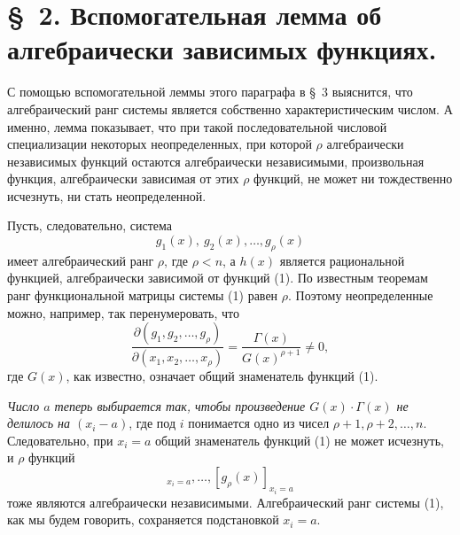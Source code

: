 \documentclass[11pt]{article}
\begin{document}
\section*{\S\ 2. Вспомогательная лемма об алгебраически зависимых функциях.}

С помощью вспомогательной леммы этого параграфа в \S\ 3 выяснится, что алгебраический ранг системы является собственно характеристическим числом. А именно, лемма показывает, что при такой последовательной числовой специализации некоторых неопределенных, при которой $\rho$ алгебраически независимых функций остаются алгебраически независимыми, произвольная функция, алгебраически зависимая от этих $\rho$ функций, не может ни тождественно исчезнуть, ни стать неопределенной.

Пусть, следовательно, система
\begin{equation}
  g_1(x),\ g_2(x),\ldots,g_\rho(x)
\tag{1}
\end{equation}
имеет алгебраический ранг $\rho$, где $\rho<n$, а $h(x)$ является рациональной функцией, алгебраически зависимой от функций (1). По известным теоремам ранг функциональной матрицы системы (1) равен $\rho$. Поэтому неопределенные можно, например, так перенумеровать, что
\begin{equation}
 \frac{\partial(g_1,g_2,\ldots,g_\rho)}{\partial(x_1,x_2,\ldots,x_\rho)}
 =\frac{\Gamma(x)}{G(x)^{\rho+1}}\ne0,
\tag{2}
\end{equation}
где $G(x)$, как известно, означает общий знаменатель функций (1).

\emph{Число $a$ теперь выбирается так, чтобы произведение $G(x)\cdot\Gamma(x)$ не делилось на $(x_i-a)$}, где под $i$ понимается одно из чисел $\rho+1,\rho+2,\ldots,n$. Следовательно, при $x_i=a$ общий знаменатель функций (1) не может исчезнуть, и $\rho$ функций
\begin{equation}
  [g_1(x)]_{x_i=a},\ldots,[g_\rho(x)]_{x_i=a}
\tag{3}
\end{equation}
тоже являются алгебраически независимыми. Алгебраический ранг системы (1), как мы будем говорить, сохраняется подстановкой $x_i=a$.
\end{document}
